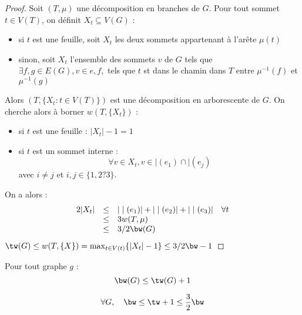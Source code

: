 \documentclass[a4paper, 11pt]{thesis}
\begin{document}
\begin{proof}
    Soit $(T, \mu)$ une décomposition en branches de $G$. Pour tout sommet $t \in V(T)$, on définit
    $X_t \subseteq V(G)$ : 
    \begin{itemize}
        \item si $t$ est une feuille, soit $X_t$  les deux sommets appartenant à l'arête $\mu(t)$
        \item sinon, soit $X_t$ l'ensemble des sommets $v$ de $G$ tels que $\exists f, g \in E(G), v
            \in e, f,$ tels que $t$ st dans le chamin dans $T$ entre $\mu^{-1}(f)$ et $\mu^{-1}(g)$
    \end{itemize}
    Alors $(T, \{X_t : t \in V(T) \})$ est une décomposition en arborescente de $G$. On cherche
    alors à borner $w(T, \{X_t\})$ :
    \begin{itemize}
        \item si $t$ est une feuille : $|X_t| - 1 = 1 $
        \item si $t$ est un sommet interne :
            \begin{displaymath}
                \forall v \in X_t, v \in \mid(e_1) \cap \mid(e_j)
            \end{displaymath}
            avec $i \neq j$ et $i, j \in \{1, 2? 3\}$.
    \end{itemize}
    On a alors : \begin{displaymath}
        \begin{array}{rcll}
            2|X_t| & \leq & |\mid(e_1)| + |\mid(e_2)| + |\mid(e_3)| & \forall t \\
                   & \leq & 3 w(T, \mu) \\
                   & \leq & 3/2 \bw(G) \\
        \end{array}
    \end{displaymath}
    $\tw(G) \leq w(T, \{X\}) = \max_{t \in V(t)} \{|X_t| - 1\} \leq 3/2 \bw -1$
\end{proof}

\begin{prop}
    Pour tout graphe $g$ : 
    \begin{displaymath}
        \bw(G) \leq \tw(G) + 1
    \end{displaymath}
\end{prop}

\begin{prop}
    \begin{displaymath}
        \forall G, \quad \bw \leq \tw + 1 \leq \frac{3}{2} \bw
    \end{displaymath}
\end{prop}
\end{document}
